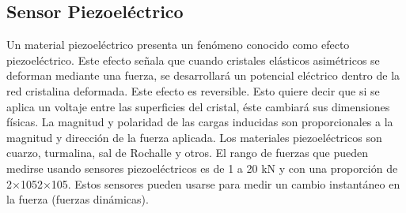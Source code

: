 \subsection*{\quad\textbf{Sensor Piezoeléctrico}}
Un material piezoeléctrico presenta un fenómeno conocido como efecto piezoeléctrico. Este efecto señala que cuando cristales elásticos asimétricos se deforman mediante una fuerza, se desarrollará un potencial eléctrico dentro de la red cristalina deformada. Este efecto es reversible. Esto quiere decir que si se aplica un voltaje entre las superficies del cristal, éste cambiará sus dimensiones físicas. La magnitud y polaridad de las cargas inducidas son proporcionales a la magnitud y dirección de la fuerza aplicada. Los materiales piezoeléctricos son cuarzo, turmalina, sal de Rochalle y otros. El rango de fuerzas que pueden medirse usando sensores piezoeléctricos es de 1 a 20 kN y con una proporción de 2×1052×105. Estos sensores pueden usarse para medir un cambio instantáneo en la fuerza (fuerzas dinámicas).
\cite{saha2014robotica}
\pagebreak





